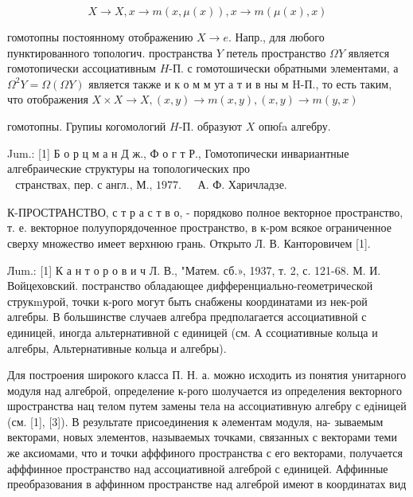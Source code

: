 \documentclass[10pt]{article}
\begin{document}
\[

X \longrightarrow X, x \longrightarrow m(x, \mu(x)), x \longrightarrow m(\mu(x), x)

\]



гомотопны постоянному отображению $X \rightarrow e$. Напр., для любого пунктированного топологич. пространства $Y$ петель пространство $\Omega Y$ является гомотопически ассоциативным $H$-П. с гомотошически обратными элементами, а $\Omega^{2} Y=\Omega(\Omega Y)$ является также и к о м м ут а т и в ны м H-П., то есть таким, что отображения $X \times X \longrightarrow X,(x, y) \longrightarrow m(x, y),(x, y) \rightarrow m(y, x)$



гомотопны. Групиы когомологий $H$-П. образуют $X$ опюfa алгебру.



Jum.: [1] Б о р ц м а н Д ж., Ф о г т Р., Гомотопически инвариантные алгебраические структуры на топологических про$\begin{array}{lll}\text { странствах, пер. с англ., М., 1977. } & \text { А. Ф. Харичладзе. }\end{array}$



К-ПРОСТРАНСТВО, с т р а с т в о, - порядково полное векторное пространство, т. е. векторное полуупорядоченное пространство, в к-ром всякое ограниченное сверху множество имеет верхнюю грань. Открыто Л. В. Канторовичем [1].



Лum.: [1] К а н т о р о в и ч Л. В., "Матем. сб.», 1937, т. 2, с. 121-68. М. И. Войцеховский. постранство обладающее дифференциально-геометрической струкmурой, точки к-рого могут быть снабжены координатами из нек-рой алгебры. В большинстве случаев алгебра предполагается ассоциативной с единицей, иногда альтернативной с единицей (см. А ссоциативные кольца и алгебры, Альтернативные кольца и алгебры).



Для построения широкого класса П. Н. а. можно исходить из понятия унитарного модуля над алгеброй, определение к-рого шолучается из определения векторного шространства нац телом путем замены тела на ассоциативную алгебру с едіницей (см. [1], [3]). В результате присоединения к әлементам модуля, на- зываемым векторами, новых элементов, называемых точками, связанных с векторами теми же аксиомами, что и точки афффиного пространства с его векторами, получается афффинное пространство над ассоциативной алгеброй с единицей. Аффинные преобразования в аффинном пространстве над алгеброй имеют в координатах вид
\end{document}
